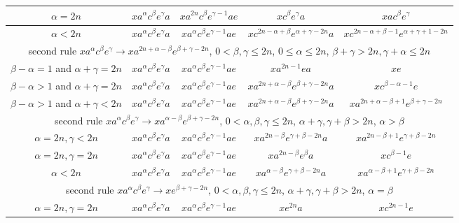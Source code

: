 \documentclass{article}
\theoremstyle{definition}
\begin{document}
\begin{center}
\begin{tabular}{|c|c|c|c|c|}
\hline
$\alpha = 2n$ & $x a^\alpha c^\beta e^\gamma a$ & $x a^{2n} c^\beta e^{\gamma-1} a e$ & $x c^\beta e^\gamma a$ & $x a c^\beta e^\gamma$ \\
\hline
$\alpha < 2n$ & $x a^\alpha c^\beta e^\gamma a$ & $x a^{\alpha} c^\beta e^{\gamma-1} a e$ & $x c^{2n-\alpha+\beta} e^{\alpha+ \gamma-2n} a$ & $x c^{2n-\alpha+\beta-1} e^{\alpha+\gamma+1-2n} $ \\
\hline
\multicolumn{5}{|c|}{second rule $x a^\alpha c^\beta e^\gamma \rightarrow x a^{2n+\alpha -\beta} e^{\beta+\gamma -2n}$,  $0< \beta, \gamma \le 2n$, $0 \le \alpha \le 2n$, $\beta+\gamma > 2n, \gamma+\alpha \le 2n$}\\
\hline
$\beta-\alpha = 1$ and $\alpha+\gamma=2n$ & $x a^\alpha c^\beta e^\gamma a$ & $x a^{\alpha} c^\beta e^{\gamma-1} a e$ & $x a^{2n-1} e a$ & $x e$ \\
\hline
$\beta - \alpha >1$ and $\alpha+\gamma=2n$  & $x a^\alpha c^\beta e^\gamma a$ & $x a^{\alpha} c^\beta e^{\gamma-1} a e$ & $x a^{2n+\alpha -\beta} e^{\beta+\gamma -2n} a$ & $x c^{\beta-\alpha-1} e$ \\
\hline
$\beta - \alpha >1$ and $\alpha+\gamma<2n$ & $x a^\alpha c^\beta e^\gamma a$ & $x a^{\alpha} c^\beta e^{\gamma-1} a e$ & $x a^{2n+\alpha -\beta} e^{\beta+\gamma -2n} a$ & $x a^{2n+\alpha -\beta+1} e^{\beta+\gamma -2n}$ \\
\hline
\multicolumn{5}{|c|}{second rule $x a^\alpha c^\beta e^\gamma \rightarrow x a^{\alpha - \beta} e^{\beta+\gamma - 2n}$,  $0< \alpha,\beta, \gamma \le 2n$, $\alpha+\gamma, \gamma+\beta > 2n$, $\alpha > \beta$}\\
\hline
$\alpha = 2n, \gamma < 2n$ & $x a^\alpha c^\beta e^\gamma a $ & $x a^{\alpha} c^\beta e^{\gamma-1} a e$ & $x a^{2n - \beta} e^{\gamma+\beta - 2n} a$ & $x a^{2n - \beta+1} e^{\gamma+\beta - 2n} $\\
\hline
$\alpha = 2n, \gamma = 2n$ & $x a^\alpha c^\beta e^\gamma a $ & $x a^{\alpha} c^\beta e^{\gamma-1} a e$ & $x a^{2n - \beta} e^{\beta} a$ & $x c^{\beta-1} e$\\
\hline
$\alpha < 2n$ & $x a^\alpha c^\beta e^\gamma a $ & $x a^{\alpha} c^\beta e^{\gamma-1} a e$ & $x a^{\alpha - \beta} e^{\gamma+\beta - 2n} a$ & $x a^{\alpha - \beta+1} e^{\gamma+\beta - 2n} $\\
\hline
\multicolumn{5}{|c|}{second rule $x a^\alpha c^\beta e^\gamma \rightarrow x  e^{\beta+\gamma - 2n}$,  $0< \alpha,\beta, \gamma \le 2n$, $\alpha+\gamma, \gamma+\beta > 2n$, $\alpha = \beta$}\\
\hline
$\alpha = 2n, \gamma = 2n$ & $x a^\alpha c^\beta e^\gamma a $ & $x a^{\alpha} c^\beta e^{\gamma-1} a e$ & $x  e^{2n} a$ & $x c^{2n-1} e$\\

\end{tabular}
\end{center}
\end{document}
